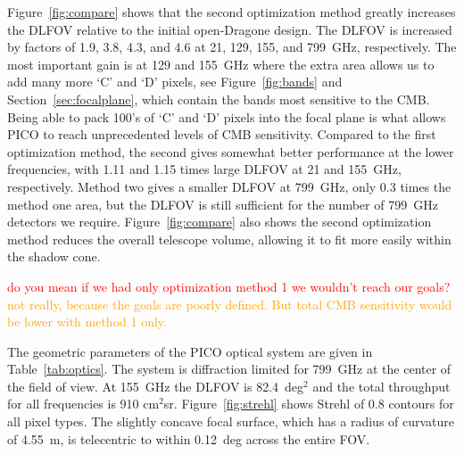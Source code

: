 \documentclass[]{spie}  %
\newcommand{\comr}[1]{\textcolor{red}{#1}}
\newcommand{\como}[1]{\textcolor{orange}{#1}}
\begin{document}
Figure~\ref{fig:compare} shows that the second optimization method greatly increases the DLFOV relative to the initial open-Dragone design.  
The DLFOV is increased by factors of 1.9, 3.8, 4.3, and 4.6 at 21, 129, 155, and 799~GHz, respectively.  
The most important gain is at 129 and 155~GHz where the extra area allows us to add 
many more `C' and `D' pixels, see Figure~\ref{fig:bands} and Section~\ref{sec:focalplane}, 
which contain the bands most sensitive to the CMB. 
Being able to pack 100's of `C' and `D' pixels into the focal plane is what allows PICO to reach unprecedented levels of CMB sensitivity. 
Compared to the first optimization method, the second gives somewhat better performance at the lower frequencies, with 1.11 and 1.15 times large DLFOV at 21 and 155~GHz, respectively.
Method two gives a smaller DLFOV at 799~GHz, only 0.3 times the method one area, but the DLFOV is still sufficient for the number of 799~GHz detectors we require. Figure~\ref{fig:compare} also shows the second optimization method reduces the overall telescope volume, allowing it to fit more easily within the shadow cone. 

\comr{do you mean if we had only optimization method 1 we wouldn't reach our goals?} \como{not really, because the goals are poorly defined.  But total CMB sensitivity would be lower with method 1 only.}

The geometric parameters of the PICO optical system are given in Table~\ref{tab:optics}. The 
system is diffraction limited for 799~GHz at the center of the field of view. At 155~GHz the 
DLFOV is 82.4~deg$^2$ and the total throughput for all frequencies is 910 cm$^2$sr. 
Figure~\ref{fig:strehl} shows Strehl of 0.8 contours for all pixel types.
The slightly concave focal surface, which has a radius of curvature of 4.55~m, is telecentric to 
within 0.12~deg across the entire FOV.
\end{document}
